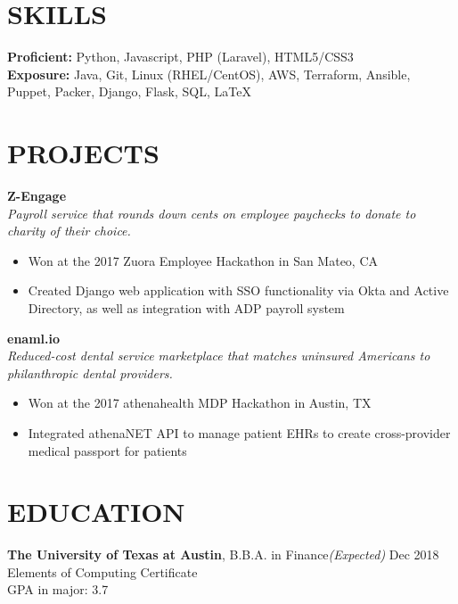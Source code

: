 \documentclass{resume}
\begin{document}
\section{SKILLS}
\textbf{Proficient:} Python, Javascript, PHP (Laravel), HTML5/CSS3\\
\textbf{Exposure:} Java, Git, Linux (RHEL/CentOS), AWS, Terraform, Ansible, Puppet, Packer, Django, Flask, SQL, \LaTeX
\vspace{5pt}

\section{PROJECTS}
\textbf{Z-Engage}\\
\emph{Payroll service that rounds down cents on employee paychecks to donate to charity of their choice.}
\begin{itemize}\itemsep0.3em
\item Won at the 2017 Zuora Employee Hackathon in San Mateo, CA
\item Created Django web application with SSO functionality via Okta and Active Directory, as well as integration with ADP payroll system
\end{itemize}\vspace{5pt}

\textbf{enaml.io}\\
\emph{Reduced-cost dental service marketplace that matches uninsured Americans to philanthropic dental providers.}
\begin{itemize}\itemsep0.3em
\item Won at the 2017 athenahealth MDP Hackathon in Austin, TX
\item Integrated athenaNET API to manage patient EHRs to create cross-provider medical passport for patients
\end{itemize}\vspace{5pt}

\section{EDUCATION}
\textbf{The University of Texas at Austin}, B.B.A. in Finance\hfill {\emph{(Expected)} Dec 2018}\\
Elements of Computing Certificate\\
GPA in major: 3.7
\end{document}
